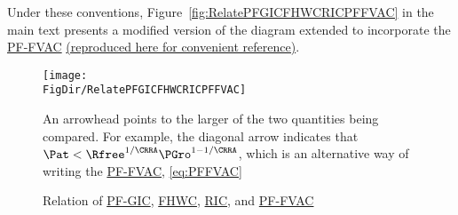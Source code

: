 \documentclass[\econtexRoot/BufferStockTheory]{subfiles}
\newcommand{\BSTlinkTo}{https://\owner.github.io/BufferStockTheory}
\renewcommand{\FHWC}{\href{{\BSTlinkTo}FHWC}{\textrm{FHWC}}}
\renewcommand{\FHWC}{\href{{\BSTlinkTo}\#FHWC}{\textrm{FHWC}}}
\renewcommand{\PFGIC}{\href{{\BSTlinkTo}\#PFGIC}{\textrm{PF-GIC}}}
\renewcommand{\RIC}{\href{{\BSTlinkTo}\#RIC}{\textrm{RIC}}}
\renewcommand{\PFFVAC}{\href{{\BSTlinkTo}\#PFFVAC}{\textrm{PF-FVAC}}}
\begin{document}
Under these conventions, Figure~\ref{fig:RelatePFGICFHWCRICPFFVAC} in the main text presents a modified version of the diagram extended to incorporate the {\PFFVAC} \href{https://econ-ark.github.io/BufferStockTheory/#RelatePFGICFHWCRICPFFVAC}{(reproduced here for convenient reference)}.

\begin{figure}[h]
  \centerline{
    \texttt{[image: \\FigDir/RelatePFGICFHWCRICPFFVAC]}
  }
  \caption{Relation of \PFGIC, \FHWC, \RIC, and \PFFVAC} \label{fig:RelatePFGICFHWCRICPFFVACApp}
  \footnotesize{An arrowhead points to the larger of the two quantities being compared.  For example, the diagonal arrow indicates that $\Pat < \Rfree^{1/\CRRA}\PGro^{1-1/\CRRA}$, which is an alternative way of writing the {\PFFVAC}, \eqref{eq:PFFVAC}}
\end{figure}
\end{document}
